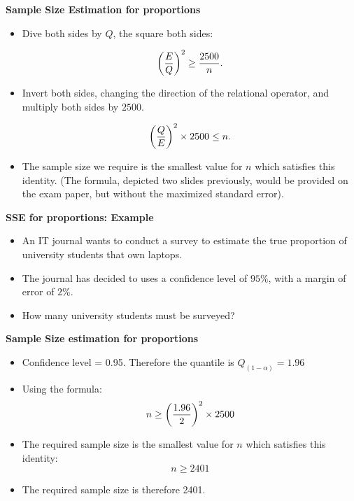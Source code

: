 \documentclass[]{report}
\begin{document}

\textbf{Sample Size Estimation for proportions}

\begin{itemize}

\item  Dive both sides by $Q$, the square both sides:

\[ \left({E\over Q}\right)^2 \geq {2500 \over n}. \]

\item  Invert both sides, changing the direction of the relational operator, and multiply both sides by $2500$.

\[ \left({Q\over E}\right)^2 \times 2500 \leq n. \]

\item  The sample size we require is the smallest value for $n$ which satisfies this identity. (The formula,  depicted two slides previously, would be provided on the exam paper, but without the maximized standard error).
\end{itemize}


\textbf{SSE for proportions: Example}
\begin{itemize}
\item  An IT journal wants to conduct a survey to estimate the true proportion of university students that own laptops.
\item  The journal has decided to uses a confidence level of $95\%$, with a margin of error of $2\%$.
\item  How many university students must be surveyed?
\end{itemize}



\textbf{Sample Size estimation for proportions}

\begin{itemize}
\item  Confidence level = 0.95. Therefore the quantile is $Q_{(1-\alpha)} = 1.96$
\item  Using the formula: \[ n \geq \left({1.96 \over 2 }\right)^2 \times 2500  \]
\item  The required sample size is the smallest value for $n$ which satisfies this identity: \[ n \geq 2401  \]
\item  The required sample size is therefore 2401.
\end{itemize}
\end{document}
